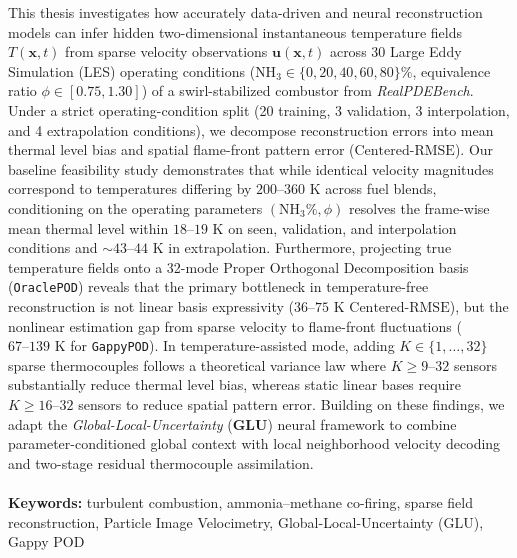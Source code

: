 \documentclass{Configuration_Files/PoliMi3i_thesis}
\begin{document}
This thesis investigates how accurately data-driven and neural reconstruction models can infer hidden two-dimensional instantaneous temperature fields $T(\mathbf{x}, t)$ from sparse velocity observations $\mathbf{u}(\mathbf{x}, t)$ across 30 Large Eddy Simulation (LES) operating conditions ($\text{NH}_3 \in \{0, 20, 40, 60, 80\}\%$, equivalence ratio $\phi \in [0.75, 1.30]$) of a swirl-stabilized combustor from \textit{RealPDEBench}. Under a strict operating-condition split (20 training, 3 validation, 3 interpolation, and 4 extrapolation conditions), we decompose reconstruction errors into mean thermal level bias and spatial flame-front pattern error ($\text{Centered-RMSE}$). Our baseline feasibility study demonstrates that while identical velocity magnitudes correspond to temperatures differing by $200\text{--}360\text{ K}$ across fuel blends, conditioning on the operating parameters $(\text{NH}_3\%, \phi)$ resolves the frame-wise mean thermal level within $18\text{--}19\text{ K}$ on seen, validation, and interpolation conditions and $\sim 43\text{--}44\text{ K}$ in extrapolation. Furthermore, projecting true temperature fields onto a 32-mode Proper Orthogonal Decomposition basis (\texttt{OraclePOD}) reveals that the primary bottleneck in temperature-free reconstruction is not linear basis expressivity ($36\text{--}75\text{ K}$ $\text{Centered-RMSE}$), but the nonlinear estimation gap from sparse velocity to flame-front fluctuations ($67\text{--}139\text{ K}$ for \texttt{GappyPOD}). In temperature-assisted mode, adding $K \in \{1, \dots, 32\}$ sparse thermocouples follows a theoretical variance law where $K \ge 9\text{--}32$ sensors substantially reduce thermal level bias, whereas static linear bases require $K \ge 16\text{--}32$ sensors to reduce spatial pattern error. Building on these findings, we adapt the \textit{Global-Local-Uncertainty} (\textbf{GLU}) neural framework to combine parameter-conditioned global context with local neighborhood velocity decoding and two-stage residual thermocouple assimilation.
\\
\\
\textbf{Keywords:} turbulent combustion, ammonia--methane co-firing, sparse field reconstruction, Particle Image Velocimetry, Global-Local-Uncertainty (GLU), Gappy POD

\end{document}
